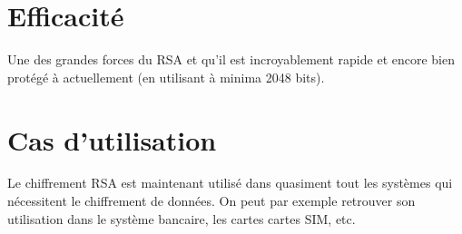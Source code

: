 	\section{Efficacité}
		Une des grandes forces du RSA et qu'il est incroyablement rapide et encore bien protégé à actuellement (en utilisant à minima 2048 bits).
		
	\section{Cas d'utilisation}
		Le chiffrement RSA est maintenant utilisé dans quasiment tout les systèmes qui nécessitent le chiffrement de données. On peut par exemple retrouver son utilisation dans le système bancaire, les cartes cartes SIM, etc.